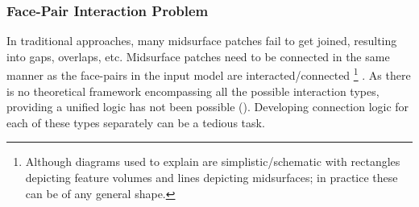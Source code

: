 \subsubsection{Face-Pair Interaction Problem} \label{sec:facepairinteraction}

In traditional approaches, many midsurface patches fail to get joined, resulting into gaps, overlaps, etc. Midsurface patches need to be connected in the same manner as the face-pairs in the input model are interacted/connected \footnote{Although diagrams used to explain are simplistic/schematic with rectangles depicting feature volumes and lines depicting midsurfaces; in practice these can be of any general shape.} . As there is no theoretical framework encompassing all the possible interaction types, providing a unified logic has not been possible  (\cite{Stolt2006}). Developing connection logic for each of these types separately can be a tedious task. 


